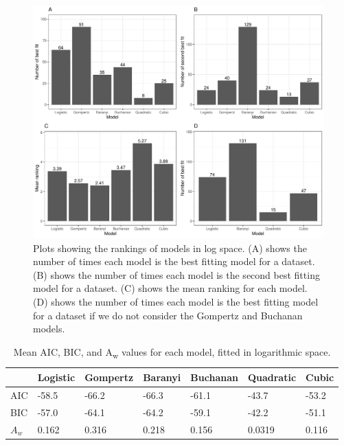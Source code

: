 \documentclass[11pt, a4paper]{article}
\begin{document}
\begin{linenumbers}
        \begin{figure}[H]
        \includegraphics[width=\linewidth]{../results/best_fit_frequency_bar.pdf}
        \caption{Plots showing the rankings of models in log space. (A) shows the number of times each model is the best fitting model for a dataset. (B) shows the number of times each model is the second best fitting model for a dataset. (C) shows the mean ranking for each model. (D) shows the number of times each model is the best fitting model for a dataset if we do not consider the Gompertz and Buchanan models. }
        \label{fig:bestbars}
        \end{figure}
        
         \begin{table}[H]
\centering
\begin{tabular}{l|llllll}
       & Logistic & Gompertz & Baranyi & Buchanan & Quadratic & Cubic \\ \hline
AIC & -58.5    & -66.2    & -66.3   & -61.1    & -43.7     & -53.2 \\
BIC & -57.0    & -64.1    & -64.2   & -59.1    & -42.2     & -51.1 \\
$A_w$ & 0.162     & 0.316     & 0.218   & 0.156     & 0.0319     & 0.116
\end{tabular}
\caption{Mean AIC, BIC, and A\textsubscript{w}  values for each model, fitted in logarithmic space.}
\label{tab:meanAICBIC}
\end{table}





\end{linenumbers}
\end{document}
